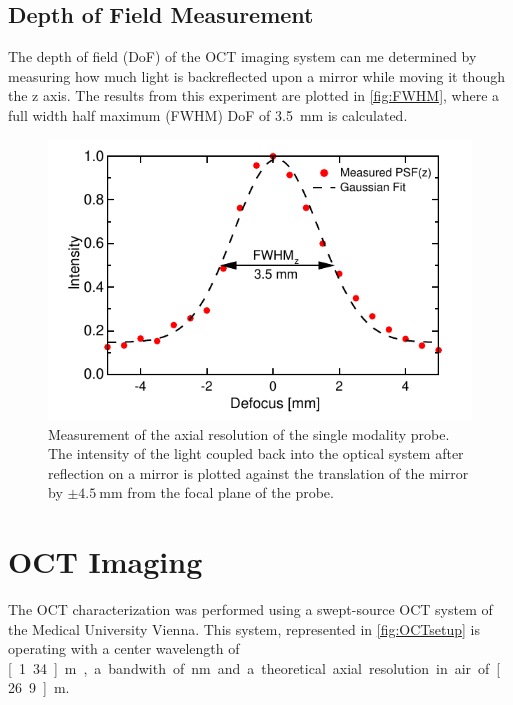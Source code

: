 \subsection{Depth of Field Measurement}
The depth of field (DoF) of the OCT imaging system can me determined by measuring how much light is backreflected upon a mirror while moving it though the z axis. The results from this experiment are plotted in \autoref{fig:FWHM}, where a full width half maximum (FWHM) DoF of \SI{3.5}{\milli\meter} is calculated. 

\begin{figure}[h!]\centering \includegraphics{figures/50_Measurements/conf/res/PSFz.pdf}
      \caption{Measurement of the axial resolution of the single modality probe. The intensity of the light coupled back into the optical system after reflection on a mirror is plotted against the translation of the mirror by $\pm \SI{4.5}{\milli\meter}$ from the focal plane of the probe. }
      \label{fig:FWHM}
\end{figure}




\clearpage
\section{OCT Imaging}

The OCT characterization was performed using a swept-source OCT system of the Medical University Vienna. This system, represented in \autoref{fig:OCTsetup} is operating with a center wavelength of \unit[1.34]{\textmu m}, a bandwith of \unit[37]{nm} and a theoretical axial resolution in air of \unit[26.9]{\textmu m}.

